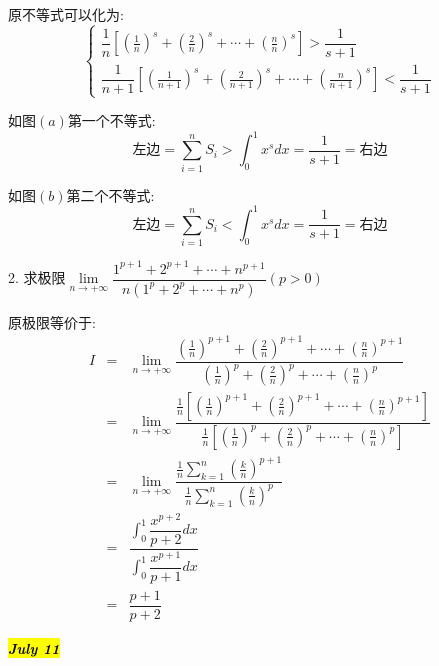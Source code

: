 \begin{solution}
	
	原不等式可以化为: 
	$$\left\lbrace
	\begin{array}{l}
		\dfrac{1}{n}[(\frac{1}{n})^s+(\frac{2}{n})^s+\cdots+(\frac{n}{n})^s]>\dfrac{1}{s+1}\\
		\dfrac{1}{n+1}[(\frac{1}{n+1})^s+(\frac{2}{n+1})^s+\cdots+(\frac{n}{n+1})^s]<\dfrac{1}{s+1}
	\end{array}
	\right. $$
	
	如图$(a)$第一个不等式: 
	$$\text{左边}=\sum\limits_{i=1}^{n}S_{i}>\int_{0}^{1}x^sdx=\dfrac{1}{s+1}=\text{右边}$$
	
	如图$(b)$第二个不等式: 
	$$\text{左边}=\sum\limits_{i=1}^{n}S_{i}<\int_{0}^{1}x^sdx=\dfrac{1}{s+1}=\text{右边}$$
\end{solution}

2. 求极限$\lim\limits_{n\rightarrow +\infty}\dfrac{1^{p+1}+2^{p+1}+\cdots+n^{p+1}}{n(1^p+2^p+\cdots+n^p)}(p>0)$
\begin{solution}
	
	原极限等价于: 
	\begin{eqnarray*}
		I&=&\lim\limits_{n\rightarrow +\infty}\dfrac{(\frac{1}{n})^{p+1}+(\frac{2}{n})^{p+1}+\cdots+(\frac{n}{n})^{p+1}}{(\frac{1}{n})^{p}+(\frac{2}{n})^{p}+\cdots+(\frac{n}{n})^{p}}\\
		&=&\lim\limits_{n\rightarrow +\infty}\dfrac{\frac{1}{n}[(\frac{1}{n})^{p+1}+(\frac{2}{n})^{p+1}+\cdots+(\frac{n}{n})^{p+1}]}{\frac{1}{n}[(\frac{1}{n})^{p}+(\frac{2}{n})^{p}+\cdots+(\frac{n}{n})^{p}]}\\
		&=&\lim\limits_{n\rightarrow +\infty}\dfrac{\frac{1}{n}\sum\limits_{k=1}^{n}(\frac{k}{n})^{p+1}}{\frac{1}{n}\sum\limits_{k=1}^{n}(\frac{k}{n})^{p}}\\
		&=&\dfrac{\int_{0}^{1}\dfrac{x^{p+2}}{p+2}dx}{\int_{0}^{1}\dfrac{x^{p+1}}{p+1}dx}\\
		&=&\dfrac{p+1}{p+2}
	\end{eqnarray*}
\end{solution}

\hl{\textbf{\textit{July 11}}}


